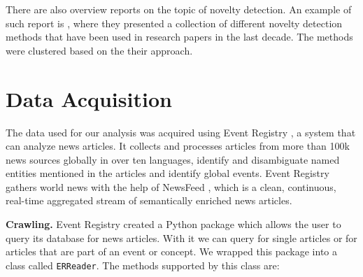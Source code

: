 \documentclass{acm_proc_article-sp}
\begin{document}
There are also overview reports on the topic of novelty detection. An example of such report is \cite{pimentel2014review}, where they presented a collection of different novelty detection methods that have been used in research papers in the last decade. The methods were clustered based on the their approach.

\section{Data Acquisition}\label{section:data-description}
The data used for our analysis was acquired using Event Registry \cite{Leban:2014:ERL:2567948.2577024}, a system that can analyze news articles. It collects and processes articles from more than 100k news sources globally in over ten languages, identify and disambiguate named entities mentioned in the articles and identify global events. Event Registry gathers world news with the help of NewsFeed \cite{trampus2012internals}, which is a clean, continuous, real-time aggregated stream of semantically enriched news articles.

\textbf{Crawling.} Event Registry created a Python package which allows the user to query its database for news articles. With it we can query for single articles or for articles that are part of an event or concept. We wrapped this package into a class called \texttt{ERReader}. The methods supported by this class are:
\end{document}
